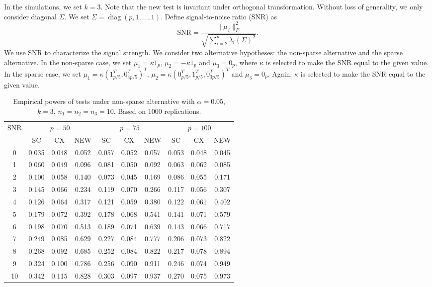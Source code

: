\documentclass[review]{elsarticle}
\DeclareMathOperator{\mytr}{tr}
\DeclareMathOperator{\mydiag}{diag}
\theoremstyle{plain}
\theoremstyle{definition}
\theoremstyle{remark}
\begin{document}
In the simulations, we set $k=3$.
Note that the new test is invariant under orthogonal transformation.
Without loss of generality, we only consider diagonal $\Sigma$.
We set $\Sigma=\mydiag(p,1,\ldots,1)$.
Define signal-to-noise ratio (SNR) as
$$
\textrm{SNR}=\frac{\|\mu_f\|_F^2}{\sqrt{\sum_{i=2}^{p}\lambda_i(\Sigma)^2}}.
$$
We use SNR to characterize the signal strength.
We consider two alternative hypotheses: the non-sparse alternative and the sparse alternative.
In the non-sparse case, we set $\mu_1=\kappa 1_p$, $\mu_2=-\kappa 1_p$ and $\mu_3=0_p$, where $\kappa$ is selected to make the SNR equal to the given value.
In the sparse case, we set $\mu_1=\kappa (1_{p/5}^T,0_{4p/5}^T)^T$, $\mu_2=\kappa (0_{p/5}^T, 1_{p/5}^T,0_{3p/5}^T)^T$ and $\mu_3=0_p$. Again, $\kappa$ is selected to make the SNR equal to the given value.



\begin{table}[!hbp]
    \caption{Empirical powers of tests under non-sparse alternative with $\alpha=0.05$, $k=3$, $n_1=n_2=n_3=10$. Based on $1000$ replications.}
    \centering
    \begin{tabular}{*{10}{c}}
    \toprule
    \multirow{2}{*}{SNR} &\multicolumn{3}{c}{$p=50$}&\multicolumn{3}{c}{$p=75$}&\multicolumn{3}{c}{$p=100$} \\
        \cmidrule(r){2-4}\cmidrule(r){5-7}\cmidrule(r){8-10}
        &SC & CX & NEW& SC & CX & NEW &SC & CX & NEW\\
    \midrule
0 & 0.035 & 0.048 & 0.052 & 0.057 & 0.052 & 0.057 & 0.053 & 0.048 & 0.045 \\ 
1 & 0.060 & 0.049 & 0.096 & 0.081 & 0.050 & 0.092 & 0.063 & 0.062 & 0.085 \\ 
2 & 0.100 & 0.058 & 0.140 & 0.073 & 0.045 & 0.169 & 0.086 & 0.055 & 0.171 \\ 
3 & 0.145 & 0.066 & 0.234 & 0.119 & 0.070 & 0.266 & 0.117 & 0.056 & 0.307 \\ 
4 & 0.126 & 0.064 & 0.317 & 0.121 & 0.059 & 0.380 & 0.122 & 0.061 & 0.402 \\ 
5 & 0.179 & 0.072 & 0.392 & 0.178 & 0.068 & 0.541 & 0.141 & 0.071 & 0.579 \\ 
6 & 0.198 & 0.070 & 0.513 & 0.189 & 0.071 & 0.639 & 0.143 & 0.066 & 0.717 \\ 
7 & 0.249 & 0.085 & 0.629 & 0.227 & 0.084 & 0.777 & 0.206 & 0.073 & 0.822 \\ 
8 & 0.268 & 0.092 & 0.685 & 0.252 & 0.084 & 0.822 & 0.217 & 0.078 & 0.894 \\ 
9 & 0.324 & 0.100 & 0.786 & 0.256 & 0.090 & 0.911 & 0.246 & 0.074 & 0.949 \\ 
10 & 0.342 & 0.115 & 0.828 & 0.303 & 0.097 & 0.937 & 0.270 & 0.075 & 0.973 \\ 
\bottomrule
\end{tabular}
\end{table}
\end{document}
